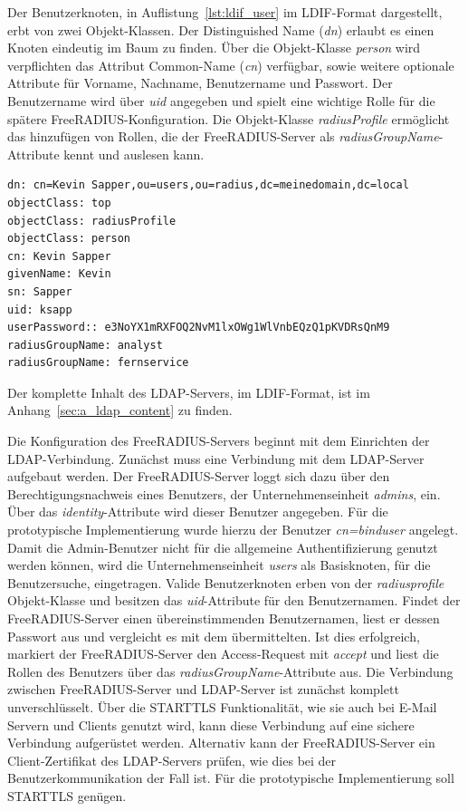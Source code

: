 \documentclass[11pt,a4paper]{report}
\begin{document}
Der Benutzerknoten, in Auflistung~\ref{lst:ldif_user} im LDIF-Format dargestellt, erbt von zwei Objekt-Klassen. Der Distinguished Name (\textit{dn}) erlaubt es einen Knoten eindeutig im Baum zu finden. Über die Objekt-Klasse \textit{person} wird verpflichten das Attribut Common-Name (\textit{cn}) verfügbar, sowie weitere optionale Attribute für Vorname, Nachname, Benutzername und Passwort. Der Benutzername wird über \textit{uid} angegeben und spielt eine wichtige Rolle für die spätere FreeRADIUS-Konfiguration. Die Objekt-Klasse \textit{radiusProfile} ermöglicht das hinzufügen von Rollen, die der FreeRADIUS-Server als \textit{radiusGroupName}-Attribute kennt und auslesen kann.

\begin{lstlisting}[caption={Benutzerbeschreibung im LDIF-Format},label=lst:ldif_user]
dn: cn=Kevin Sapper,ou=users,ou=radius,dc=meinedomain,dc=local
objectClass: top
objectClass: radiusProfile
objectClass: person
cn: Kevin Sapper
givenName: Kevin
sn: Sapper
uid: ksapp
userPassword:: e3NoYX1mRXFOQ2NvM1lxOWg1WlVnbEQzQ1pKVDRsQnM9
radiusGroupName: analyst
radiusGroupName: fernservice
\end{lstlisting}

Der komplette Inhalt des LDAP-Servers, im LDIF-Format, ist im Anhang~\ref{sec:a_ldap_content} zu finden. 

Die Konfiguration des FreeRADIUS-Servers beginnt mit dem Einrichten der LDAP-Verbindung. Zunächst muss eine Verbindung mit dem LDAP-Server aufgebaut werden. Der FreeRADIUS-Server loggt sich dazu über den Berechtigungsnachweis eines Benutzers, der Unternehmenseinheit \textit{admins}, ein. Über das \textit{identity}-Attribute wird dieser Benutzer angegeben. Für die prototypische Implementierung wurde hierzu der Benutzer \textit{cn=binduser} angelegt. Damit die Admin-Benutzer nicht für die allgemeine Authentifizierung genutzt werden können, wird die Unternehmenseinheit \textit{users} als Basisknoten, für die Benutzersuche, eingetragen. Valide Benutzerknoten erben von der \textit{radiusprofile} Objekt-Klasse und besitzen das \textit{uid}-Attribute für den Benutzernamen. Findet der FreeRADIUS-Server einen übereinstimmenden Benutzernamen, liest er dessen Passwort aus und vergleicht es mit dem übermittelten. Ist dies erfolgreich, markiert der FreeRADIUS-Server den Access-Request mit \textit{accept} und liest die Rollen des Benutzers über das \textit{radiusGroupName}-Attribute aus. Die Verbindung zwischen FreeRADIUS-Server und LDAP-Server ist zunächst komplett unverschlüsselt. Über die STARTTLS Funktionalität, wie sie auch bei E-Mail Servern und Clients genutzt wird, kann diese Verbindung auf eine sichere Verbindung aufgerüstet werden. Alternativ kann der FreeRADIUS-Server ein Client-Zertifikat des LDAP-Servers prüfen, wie dies bei der Benutzerkommunikation der Fall ist. Für die prototypische Implementierung soll STARTTLS genügen.
\end{document}
